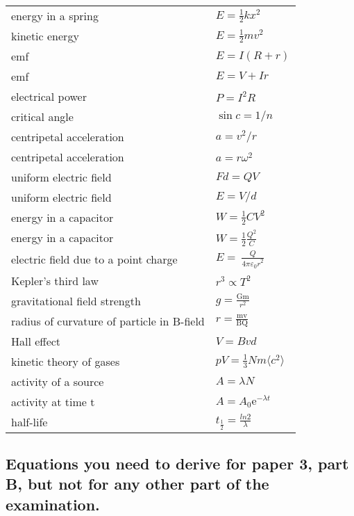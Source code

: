 \documentclass[revision-guide.tex]{subfiles}
\begin{document}
\renewcommand*{\arraystretch}{2}
\begin{longtable}{ll}
energy in a spring & $E = \frac{1}{2}kx^2$ \\
kinetic energy & $E = \frac{1}{2}mv^{2}$\\
emf & $E = I(R+r)$\\
emf & $E = V + Ir$\\
electrical power & $P = I^{2}R$\\
critical angle & $\sin{c} = 1/n$\\
centripetal acceleration & $a = v^{2}/r$\\
centripetal acceleration & $a = r\omega^2$\\
uniform electric field & $Fd = QV$\\
uniform electric field & $E = V/d$\\
energy in a capacitor & $W = \frac{1}{2}CV^2$\\
energy in a capacitor & $W = \frac{1}{2}\frac{Q^2}{C}$\\
electric field due to a point charge &
\(E = \ \frac{Q}{{4\pi\varepsilon_{0}r}^{2}}\)\\

Kepler's third law & $r^{3} \propto T^{2}$\\
gravitational field strength & \(g = \frac{\text{Gm}}{r^{2}}\)\\

radius of curvature of particle in B-field &
\(r = \frac{\text{mv}}{\text{BQ}}\) \\

Hall effect & $V = Bvd$\\

kinetic theory of gases & $pV = \frac{1}{3}Nm\langle c^2 \rangle$\\

activity of a source & $A = \lambda N$\\

activity at time t & $A = A_0\text{e}^{-\lambda t}$\\
half-life & \(t_{\frac{1}{2}} = \frac{ln2}{\lambda}\)\\
\end{longtable}


\subsection{Equations you need to derive for paper 3, part B, but not for any other part of the examination.}
\end{document}
